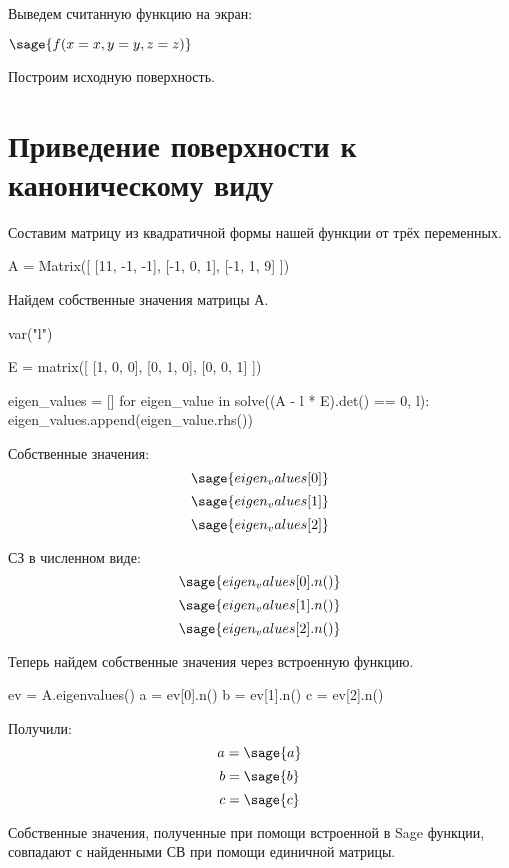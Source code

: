 \documentclass{article}
\begin{document}
Выведем считанную функцию на экран:

\begin{center}
$\sage{f(x=x, y=y, z=z)}$
\end{center}

Построим исходную поверхность.

\begin{center}
\end{center}

\section{Приведение поверхности к каноническому виду}
Составим матрицу из квадратичной формы нашей функции от трёх переменных.

\begin{sageblock}
A = Matrix([
    [11, -1, -1], 
    [-1, 0, 1], 
    [-1, 1, 9]
  ])
\end{sageblock}

Найдем собственные значения матрицы А.

\begin{sagesilent}
var("l")
\end{sagesilent}

\begin{sageblock}
E = matrix([
    [1, 0, 0],
    [0, 1, 0],
    [0, 0, 1]
])

eigen_values = []
for eigen_value in solve((A - l * E).det() == 0, l):
    eigen_values.append(eigen_value.rhs())

\end{sageblock}

Собственные значения:
$$\sage{eigen_values[0]}$$
$$\sage{eigen_values[1]}$$
$$\sage{eigen_values[2]}$$

СЗ в численном виде: 
$$\sage{eigen_values[0].n()}$$
$$\sage{eigen_values[1].n()}$$
$$\sage{eigen_values[2].n()}$$

Теперь найдем собственные значения через встроенную функцию.

\begin{sageblock}
ev = A.eigenvalues()
a = ev[0].n()
b = ev[1].n()
c = ev[2].n()
\end{sageblock}

Получили: 
$$a = \sage{a}$$
$$b = \sage{b}$$
$$c = \sage{c}$$ 

Собственные значения, полученные при помощи встроенной в Sage функции, совпадают с найденными СВ при помощи единичной матрицы.
\end{document}
